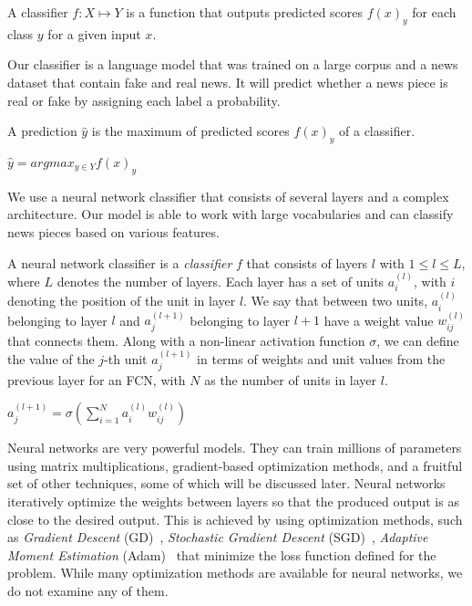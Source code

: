 \begin{definition}
    A classifier $f:X \mapsto Y$ is a function that outputs predicted scores $f(x)_y$ for each class $y$ for a given input $x$.
\end{definition}
Our classifier is a language model that was trained on a large corpus and a news dataset that contain fake and real news. It will predict whether a news piece is real or fake by assigning each label a probability.
\begin{definition}
    A prediction $\hat{y}$ is the maximum of predicted scores $f(x)_y$ of a classifier.
    \begin{center}
        $\hat{y} = argmax_{y \in Y} f(x)_y$
    \end{center}
\end{definition}
We use a neural network classifier that consists of several layers and a complex architecture. Our model is able to work with large vocabularies and can classify news pieces based on various features.
\begin{definition}
    A neural network classifier is a \emph{classifier} $f$ that consists of layers $l$ with $1 \leq l \leq L$, where $L$ denotes the number of layers. Each layer has a set of units $a_i^{(l)}$, with $i$ denoting the position of the unit in layer $l$. We say that between two units, $a_i^{(l)}$ belonging to layer $l$ and $a_j^{(l+1)}$ belonging to layer
    $l+1$ have a weight value $w_{ij}^{(l)}$ that connects them. Along with a non-linear activation function $\sigma$, we
    can define the value of the $j$-th unit $a_j^{(l+1)}$ in terms of weights and unit values from the previous layer for an FCN, with $N$ as the number of units in layer $l$.
    \begin{center}
        $a_j^{(l+1)} = \sigma(\sum\limits_{i=1}^{N} a_i^{(l)} w_{ij}^{(l)})$
    \end{center}
\end{definition}
Neural networks are very powerful models. They can train millions of parameters using matrix multiplications, gradient-based optimization methods, and a fruitful set of other techniques, some of which will be discussed later. Neural networks iteratively optimize the weights between layers so that the produced output is as close to the desired output. This is achieved by using optimization methods, such as \emph{Gradient Descent} (GD)~\parencite{GD_Cauchy}, \emph{Stochastic Gradient Descent} (SGD)~\parencite{SGD_Robbins}, \emph{Adaptive Moment Estimation} (Adam)~\parencite{Adam_Kingma} that minimize the loss function defined for the problem. While many optimization methods are available for neural networks, we do not examine any of them.\\
